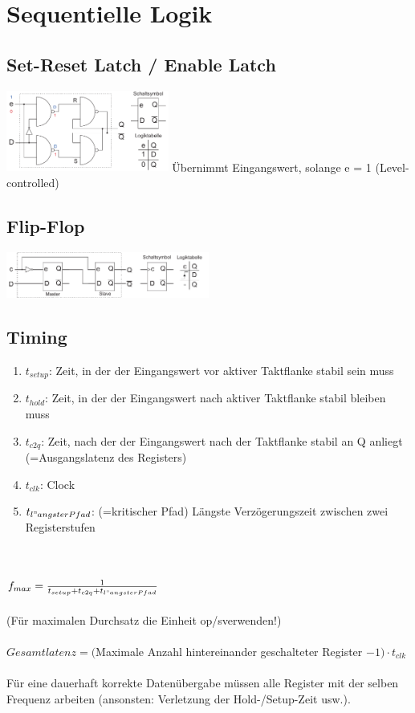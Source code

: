 \documentclass[a4paper,twocolumn,10pt]{article}
\begin{document}
\section*{Sequentielle Logik}
\subsection*{Set-Reset Latch / Enable Latch}
\includegraphics[width=0.4\textwidth]{Grafiken/SRLatch}
Übernimmt Eingangswert, solange e = 1 (Level-controlled)

\subsection*{Flip-Flop}
\includegraphics[width=0.5\textwidth]{Grafiken/FlipFlop}

\subsection*{Timing}
\begin{enumerate}[label=,leftmargin=0mm]
	\item \textbf{$t_{setup}$}: Zeit, in der der Eingangswert vor aktiver Taktflanke stabil sein muss
	\item \textbf{$t_{hold}$}: Zeit, in der der Eingangswert nach aktiver Taktflanke stabil bleiben muss
	\item \textbf{$t_{c2q}$}: Zeit, nach der der Eingangswert nach der Taktflanke stabil an Q anliegt (=Ausgangslatenz des Registers)
	\item \textbf{$t_{clk}$}: Clock
	\item \textbf{$t_{l"angsterPfad}$}: (=kritischer Pfad) Längste Verzögerungszeit zwischen zwei Registerstufen
\end{enumerate}

\\\\
$f_{max}=\frac{1}{t_{setup}+t_{c2q}+t_{l"angsterPfad}}$\\\\
(Für maximalen Durchsatz die Einheit \glqq op/s\grqq\;verwenden!)\\\\
$Gesamtlatenz=($Maximale Anzahl hintereinander geschalteter Register $-1)\cdot t_{clk}$\\\\
Für eine dauerhaft korrekte Datenübergabe müssen alle Register mit der selben Frequenz arbeiten (ansonsten: Verletzung der Hold-/Setup-Zeit usw.).
\end{document}
